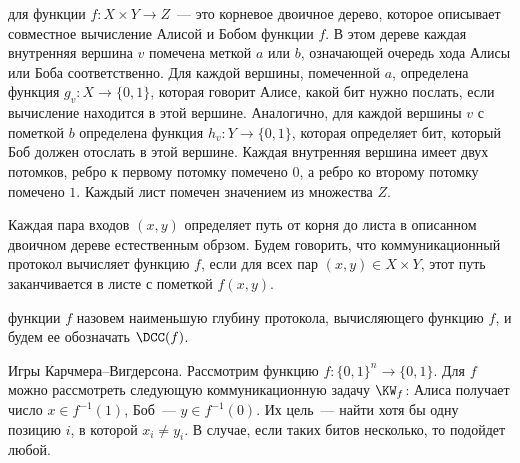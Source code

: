 

\setcounter{curtask}{15}



\begin{definition*}
     для функции $f\colon X \times Y \to Z$~--- это корневое двоичное
    дерево, которое описывает совместное вычисление Алисой и Бобом функции $f$. В этом дереве каждая
    внутренняя вершина $v$ помечена меткой $a$ или $b$, означающей очередь хода Алисы или Боба
    соответственно. Для каждой вершины, помеченной $a$, определена функция $g_v\colon X \to \{0, 1\}$, которая
    говорит Алисе, какой бит нужно послать, если вычисление находится в этой вершине. Аналогично, для
    каждой вершины $v$ с пометкой $b$ определена функция $h_v\colon Y \to \{0, 1\}$, которая определяет бит,
    который Боб должен отослать в этой вершине. Каждая внутренняя вершина имеет двух потомков, ребро к
    первому потомку помечено $0$, а ребро ко второму потомку помечено $1$. Каждый лист помечен значением
    из множества $Z$.

    Каждая пара входов $(x, y)$ определяет путь от корня до листа в описанном двоичном дереве
    естественным обрзом. Будем говорить, что коммуникационный протокол вычисляет функцию $f$, если для
    всех пар $(x, y) \in X \times Y$, этот путь заканчивается в листе с пометкой $f(x, y)$.

     функции $f$ назовем наименьшую глубину протокола, вычисляющего
    функцию $f$, и будем ее обозначать $\DCC(f)$.
\end{definition*}


\begin{definition*}
    Игры Карчмера--Вигдерсона. Рассмотрим функцию $f\colon \{0, 1\}^n \to \{0, 1\}$. Для $f$ можно
    рассмотреть следующую коммуникационную задачу $\KW_f$: Алиса получает число $x \in f^{-1}(1)$,
    Боб~--- $y \in f^{-1}(0)$. Их цель~--- найти хотя бы одну позицию $i$, в которой $x_i \ne y_i$. В
    случае, если таких битов несколько, то подойдет любой.
\end{definition*}



\breakline



